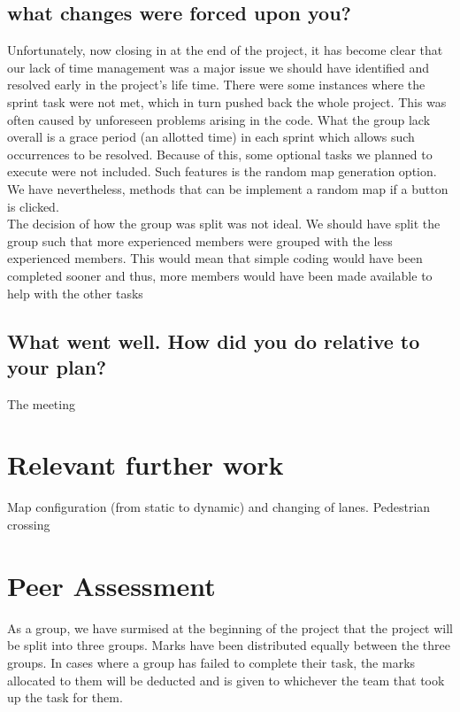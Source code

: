 \documentclass{article}
\begin{document}
		\subsection{what changes were forced upon you? }
		Unfortunately, now closing in at the end of the project, it has become clear that our lack of time management was a major issue we should have identified and resolved early in the project's life time. There were some instances where the sprint task were not met, which in turn pushed back the whole project. This was often caused by  unforeseen problems arising in the code. What the group lack overall is a grace period (an allotted time) in each sprint which allows such occurrences to be resolved. Because of this, some optional tasks we planned to execute were not included. Such features is the random map generation option.  We have nevertheless, methods that can be implement a random map if a button is clicked. \\
		The decision of how the group was split was not ideal. We should have split the group such that more experienced members were grouped with the less experienced members.  This would mean that simple  coding would have been completed sooner and thus, more members would have been made available to help with the other tasks
			
		\subsection{What went well.  How did you do relative to your plan?}
		The meeting 	
		
	\section{Relevant further work}  
			Map configuration (from static to dynamic) and changing of lanes. Pedestrian crossing
		
	\section{Peer Assessment}
		As a group, we have surmised at the beginning of the project that the project will be split into three groups.  Marks have been distributed equally between the three groups. In cases where a group has failed to complete their task, the marks allocated to them will be deducted and is given to whichever the team that took up the task for them.
\end{document}
